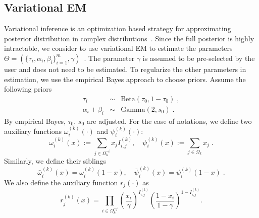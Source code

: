\documentclass[10pt,journal,letterpaper,compsoc,twoside]{IEEEtran}
\newcommand{\assign}{:=}
\begin{document}
\subsection{Variational EM}
Variational inference is an optimization based strategy for approximating
posterior distribution in complex distributions~\cite{jordan1999introduction}.
Since the full posterior is highly intractable, we consider to use variational
EM to estimate the parameters $\Theta=( \{ \tau_{i} , \alpha_{i} ,
\beta_{i} \}_{i=1}^{m} , \gamma)$~\cite{bernardo2003variational}. 
The parameter $\gamma$ is assumed to be pre-selected by the user 
and does not need to be estimated. To regularize the other parameters in estimation, we use
the empirical Bayes approach to choose priors. Assume the following priors
\begin{eqnarray}
\tau_i &\sim & \mbox{Beta}(\tau_0, 1-\tau_0)\;,\\
\alpha_i + \beta_i & \sim & \mbox{Gamma}(2, s_0) \; .
\end{eqnarray}
By empirical Bayes, $\tau_0$, $s_0$ are adjusted.  
For the ease of notations, we define two auxiliary functions $\omega_{i}^{( k )} ( \cdot )$ and
$\psi_{i}^{( k )} ( \cdot )$:
\begin{equation}
  \omega_{i}^{( k )} ( x ) \assign \sum_{j \in \Omega_{k}^{\neg i}} x_{j}
  I_{i,j}^{( k )} , \hspace{1em} \psi_{i}^{( k )} ( x ) \assign \sum_{j \in
  \Omega_{k}} x_{j}\;.
\end{equation}
Similarly, we define their siblings 
\begin{equation}
\bar{\omega}_{i}^{( k )} ( x ) 
= \omega_{i}^{( k )} ( 1-x ) , \hspace{1em}
\bar{\psi}_{i}^{( k )} ( x ) = \psi_{i}^{( k )} ( 1-x )\;.
\end{equation}
We also define the auxiliary function $r_{j} ( \cdot )$ as
\begin{equation}
  r_{j}^{( k )} ( x ) = \prod_{i \in \Omega_{k}^{\neg j}} \left(
  \dfrac{x_{i}}{\gamma} \right)^{I_{i,j}^{( k )}} \left( \dfrac{1-x_{i}}{1-
  \gamma} \right)^{1-I_{i,j}^{( k )}} .
\end{equation}\\
\end{document}
